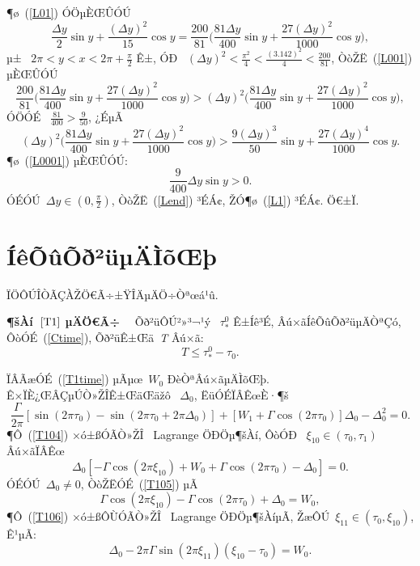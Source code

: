 \documentclass[12pt,openany,CJK,oneside]{cctbook}
\begin{document}
{¶ø\ (\ref{L01}) ÓÖµÈŒÛÓÚ
\begin{equation}\label{L001}
  \frac{\Delta y}{2}\sin y+\frac{(\Delta y)^2}{15}\cos y = \frac{200}{81}\Big(\frac{81\Delta y}{400}\sin y+\frac{27(\Delta y)^2}{1000}\cos y\Big),
\end{equation}
µ± \ $2\pi<y<x<2\pi+\frac{\pi}{2}$ Ê±, ÓÐ \ $(\Delta y)^2<\frac{\pi^2}{4}<\frac{(3.142)^2}{4}<\frac{200}{81}$,
ÒòŽË\ (\ref{L001}) µÈŒÛÓÚ
\begin{equation}
 \frac{200}{81}\Big(\frac{81\Delta y}{400}\sin y+\frac{27(\Delta y)^2}{1000}\cos y\Big) > (\Delta y)^2 \Big(\frac{81\Delta y}{400}\sin y+\frac{27(\Delta y)^2}{1000}\cos y\Big),
\end{equation}
ÓÖÓÉ \ $\frac{81}{400}>\frac{9}{50}$, ¿ÉµÃ
\begin{equation}\label{L0001}
(\Delta y)^2 \Big(\frac{81\Delta y}{400}\sin y+\frac{27(\Delta y)^2}{1000}\cos y \Big)> \frac{9(\Delta y)^3}{50}\sin y+\frac{27(\Delta y)^4}{1000}\cos y.
\end{equation}
¶ø\ (\ref{L0001}) µÈŒÛÓÚ:
\begin{equation}\label{Lend}
  \frac{9}{400}\Delta y\sin y>0.
\end{equation}
ÓÉÓÚ\ $\Delta y \in(0,\frac{\pi}{2})$, ÒòŽË\ (\ref{Lend}) ³ÉÁ¢, ŽÓ¶ø\ (\ref{L1}) ³ÉÁ¢. Ö€±Ï.
\section{\kaishu ÍêÕûÕð²üµÄÌõŒþ}

ÏÖÔÚÎÒÃÇÀŽÖ€Ã÷±ŸÎÄµÄÖ÷Òªœá¹û.

{\heiti \textbf{¶šÀí\ $\ref{T1}$ µÄÖ€Ã÷} }~~Õð²üÔÚ²»³¬¹ý \ $\tau^0_*$ Ê±Íê³É, Âú×ãÍêÕûÕð²üµÄÒªÇó, ÔòÓÉ\ (\ref{Ctime}), Õð²üÊ±Œä\ \emph{T} Âú×ã:
\begin{equation}\label{T1time}
  T\leq\tau_*^0-\tau_0.
\end{equation}

ÏÂÃæÓÉ\ (\ref{T1time}) µÃµœ\ $W_0$ ÐèÒªÂú×ãµÄÌõŒþ. Ê×ÏÈ¿ŒÂÇµÚÒ»ŽÎÊ±ŒäŒäžô \ $\Delta_0$, ËüÓÉÏÂÊœÈ·¶š
  \begin{equation}\label{T104}
  \frac{\Gamma}{2\pi}[\sin(2\pi\tau_0)-\sin(2\pi\tau_0+2\pi\Delta_0)]+[W_1+\Gamma\cos(2\pi\tau_0)]\Delta_0-\Delta_0^{2}=0.
\end{equation}
¶Ô\ (\ref{T104}) ×ó±ßÓÃÒ»ŽÎ \ Lagrange ÖÐÖµ¶šÀí, ÔòÓÐ \ $\xi_{10}\in(\tau_0,\tau_1)$ Âú×ãÏÂÊœ
\begin{equation}\label{T105}
   \Delta_0[-\Gamma\cos(2\pi\xi_{10})+W_0+\Gamma\cos(2\pi\tau_0)-\Delta_0]=0.
\end{equation}
ÓÉÓÚ\ $\Delta_0\neq 0$, ÒòŽËÓÉ\ (\ref{T105}) µÃ
\begin{equation}\label{T106}
  \Gamma\cos(2\pi\xi_{10})-\Gamma\cos(2\pi\tau_0)+\Delta_0=W_0,
\end{equation}
¶Ô\ (\ref{T106}) ×ó±ßÔÙÓÃÒ»ŽÎ \ Lagrange ÖÐÖµ¶šÀíµÃ, ŽæÔÚ\ $\xi_{11}\in(\tau_0,\xi_{10})$, Ê¹µÃ:
\begin{equation}\label{T107}
  \Delta_0-2\pi\Gamma\sin(2\pi\xi_{11})(\xi_{10}-\tau_0)=W_0.
\end{equation}

}
\end{document}
